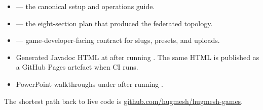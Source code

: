\documentclass[11pt,a4paper,openany]{book}
\begin{document}
\begin{itemize}
  \item {} — the canonical setup and operations guide.
  \item {} — the
        eight-section plan that produced the federated topology.
  \item {} — game-developer-facing
        contract for slugs, presets, and uploads.
  \item Generated Javadoc HTML at
         after running
        . The same HTML is published as a
        GitHub Pages artefact when CI runs.
  \item PowerPoint walkthroughs under
         after running
        .
\end{itemize}

\noindent
The shortest path back to live code is
\href{https://github.com/hugmesh/hugmesh-games}{github.com/hugmesh/hugmesh-games}.
\end{document}
